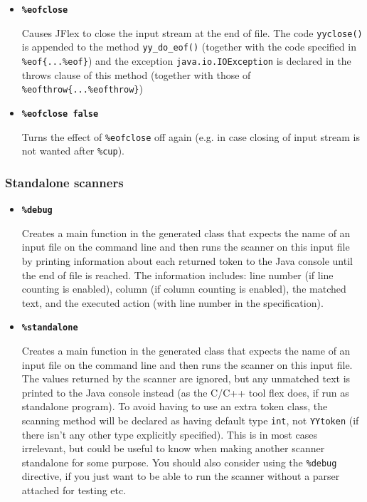 \documentclass[11pt]{scrartcl}
\begin{document}
\begin{itemize}
\label{eofclose}
\item{\bf \texttt{\%eofclose}}
  
  Causes JFlex to close the input stream at the end of file. The code
  \texttt{yyclose()} is appended to the method \texttt{yy\_do\_eof()}
  (together with the code specified in \verb+%eof{...%eof}+) and
  the exception \texttt{java.io.IOException} is declared in the throws
  clause of this method (together with those of 
  \verb+%eofthrow{...%eofthrow}+)


\item{\bf \texttt{\%eofclose false}}
  
  Turns the effect of \texttt{\%eofclose} off again (e.g. in case closing of
  input stream is not wanted after \texttt{\%cup}).

\end{itemize}

\subsubsection{Standalone scanners\label{Standalone}}
\begin{itemize}
\item
{\bf \texttt{\%debug}}

Creates a main function in the generated class that expects the name
of an input file on the command line and then runs the scanner on this
input file by printing information about each returned token to the Java 
console until the end of file is reached. The information includes:
line number (if line counting is enabled), column (if column counting is enabled),
the matched text, and the executed action (with line number in the specification).
 
\item
{\bf \texttt{\%standalone}}

Creates a main function in the generated class that expects the name
of an input file on the command line and then runs the scanner on this
input file. The values returned by the scanner are ignored, but any unmatched
text is printed to the Java console instead (as the C/C++ tool flex does, if
run as standalone program). To avoid having to use an extra token class, the
scanning method will be declared as having default type \texttt{int}, not \texttt{YYtoken}
(if there isn't any other type explicitly specified).
This is in most cases irrelevant, but could be useful to know when making
another scanner standalone for some purpose. You should also consider using
the \texttt{\%debug} directive, if you just want to be able to run the scanner
without a parser attached for testing etc.

\end{itemize}
\end{document}
